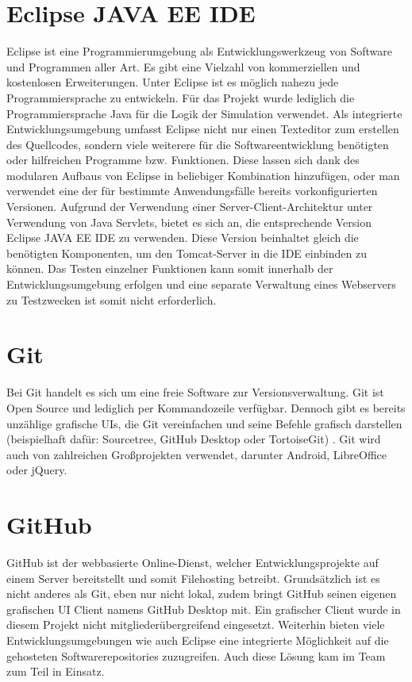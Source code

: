 \section{Eclipse JAVA EE IDE}
Eclipse ist eine Programmierumgebung als Entwicklungswerkzeug von Software und Programmen aller Art. Es gibt eine Vielzahl von kommerziellen und kostenlosen Erweiterungen. Unter Eclipse ist es möglich nahezu jede Programmiersprache zu entwickeln. Für das Projekt wurde lediglich die Programmiersprache Java für die Logik der Simulation verwendet. Als integrierte Entwicklungsumgebung umfasst Eclipse nicht nur einen Texteditor zum erstellen des Quellcodes, sondern viele weiterere für die Softwareentwicklung benötigten oder hilfreichen Programme bzw. Funktionen. Diese lassen sich dank des modularen Aufbaus von Eclipse in beliebiger Kombination hinzufügen, oder man verwendet eine der für bestimmte Anwendungsfälle bereits vorkonfigurierten Versionen. Aufgrund der Verwendung einer Server-Client-Architektur unter Verwendung von Java Servlets, bietet es sich an, die entsprechende Version Eclipse JAVA EE IDE zu verwenden. Diese Version beinhaltet gleich die benötigten Komponenten, um den Tomcat-Server in die IDE einbinden zu können. Das Testen einzelner Funktionen kann somit innerhalb der Entwicklungsumgebung erfolgen und eine separate Verwaltung eines Webservers zu Testzwecken ist somit nicht erforderlich.
\section{Git}
Bei Git handelt es sich um eine freie Software zur Versionsverwaltung. Git ist Open Source und lediglich per Kommandozeile verfügbar. Dennoch gibt es bereits unzählige grafische UIs, die Git vereinfachen und seine Befehle grafisch darstellen (beispielhaft dafür: Sourcetree, GitHub Desktop oder TortoiseGit) . Git wird auch von zahlreichen Großprojekten verwendet, darunter Android, LibreOffice oder jQuery. 
\section{GitHub}
GitHub ist der webbasierte Online-Dienst, welcher Entwicklungsprojekte auf einem Server bereitstellt und somit Filehosting betreibt. Grundsätzlich ist es nicht anderes als Git, eben nur nicht lokal, zudem bringt GitHub seinen eigenen grafischen UI Client namens GitHub Desktop mit. Ein grafischer Client wurde in diesem Projekt nicht mitgliederübergreifend eingesetzt. Weiterhin bieten viele Entwicklungsumgebungen wie auch Eclipse eine integrierte Möglichkeit auf die gehosteten Softwarerepositories zuzugreifen. Auch diese Lösung kam im Team zum Teil in Einsatz.
